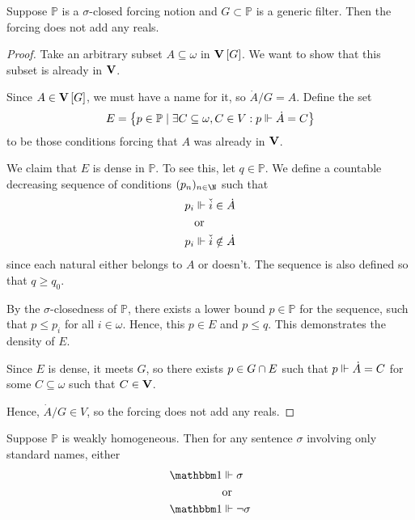 \documentclass[11pt]{article}
\renewcommand{\P}{\mathbb{P}}
\begin{document}
\begin{prop}
    Suppose $\P$ is a $\sigma$-closed forcing notion and $G \subset \P$ is a
    generic filter. Then the forcing does not add any reals.
\end{prop}

\begin{proof}
    Take an arbitrary subset $A \subseteq \omega$ in $\m$.
    We want to show that this subset is already in $\verum$.

    Since $A \in \m$, we must have a name for it, so $\dot A / G = A$.
    Define the set
    \begin{equation*}
        E = \setof{
            p \in \P
            \sth
            \exists C \subseteq \omega, C \in V: p \forces \dot A = C
        }
    \end{equation*}
    to be those conditions forcing that $A$ was already in $\verum$.

    We claim that $E$ is dense in $\P$. To see this, let $q \in \P$.
    We define a countable decreasing sequence of conditions $(p_n)_{n\in\N}$
    such that
    \begin{align*}
        p_i &\Vdash \check i \in \dot A \\
            &\text{or} \\
        p_i &\Vdash \check i \notin \dot A
    \end{align*}
    since each natural either belongs to $A$ or doesn't. The sequence is also
    defined so that $q \geq q_0$.

    By the $\sigma$-closedness of $\P$, there exists a lower bound $p \in \P$
    for the sequence, such that $p \leq p_i$ for all $i \in \omega$.
    Hence, this $p \in E$ and $p \leq q$. This demonstrates the density of $E$.

    Since $E$ is dense, it meets $G$, so there exists $p \in G \cap E$ such
    that $p \Vdash \dot A = C$ for some $C \subseteq \omega$ such that
    $C \in \verum$.

    Hence, $\dot A / G \in V$, so the forcing does not add any reals.
\end{proof}

\begin{prop}
    Suppose $\mathbb{P}$ is weakly homogeneous.
    Then for any sentence $\sigma$ involving only standard names, either
    \begin{align*}
        \one &\forces \sigma \\
             &\text{or}      \\
        \one &\forces \neg \sigma
    \end{align*}
\end{prop}
\end{document}
